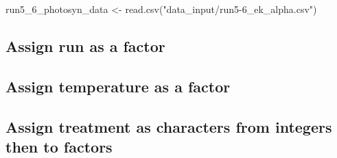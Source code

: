 \documentclass[
]{article}
\newenvironment{Shaded}{\begin{snugshade}}{\end{snugshade}}
\newcommand{\FunctionTok}[1]{\textcolor[rgb]{0.00,0.00,0.00}{#1}}
\newcommand{\NormalTok}[1]{#1}
\newcommand{\OtherTok}[1]{\textcolor[rgb]{0.56,0.35,0.01}{#1}}
\newcommand{\SpecialCharTok}[1]{\textcolor[rgb]{0.00,0.00,0.00}{#1}}
\newcommand{\StringTok}[1]{\textcolor[rgb]{0.31,0.60,0.02}{#1}}
\begin{document}
\begin{Shaded}
\begin{Highlighting}[]
\NormalTok{run5\_6\_photosyn\_data }\OtherTok{\textless{}{-}} \FunctionTok{read.csv}\NormalTok{(}\StringTok{"data\_input/run5{-}6\_ek\_alpha.csv"}\NormalTok{)}
\end{Highlighting}
\end{Shaded}

\hypertarget{assign-run-as-a-factor}{%
\subsection{Assign run as a factor}\label{assign-run-as-a-factor}}

\begin{Shaded}
\end{Shaded}

\hypertarget{assign-temperature-as-a-factor}{%
\subsection{Assign temperature as a
factor}\label{assign-temperature-as-a-factor}}

\begin{Shaded}
\end{Shaded}

\hypertarget{assign-treatment-as-characters-from-integers-then-to-factors}{%
\subsection{Assign treatment as characters from integers then to
factors}\label{assign-treatment-as-characters-from-integers-then-to-factors}}

\begin{Shaded}
\end{Shaded}
\end{document}
